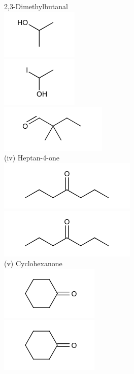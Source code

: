 \documentclass[10pt]{article}
\begin{document}
2,3-Dimethylbutanal\\
\includegraphics{smile-96f39493b19bbe0ed0eae201b8bf14dd2d9e50ba}\\
\includegraphics{smile-68c43d298e60f730bb565f1eecb6f50b58c5ec63}\\
\includegraphics{smile-9e6a3db21d6d87ea3aec6b33850acac93c32e902}\\
(iv) Heptan-4-one\\
\includegraphics{smile-b702a2ef532a34542d15cf6ce3379ad21fbe36da}\\
\includegraphics{smile-72b4fa0c55fab7d5ec9d8f9105d21a6c3608f98e}\\
(v) Cyclohexanone\\
\includegraphics{smile-27f5b6de2b5ccbf795efd657f3b4c741e6d72ac7}\\
\includegraphics{smile-bc4deeb050d928889ee95382c8d3241b78a6403c}
\end{document}

